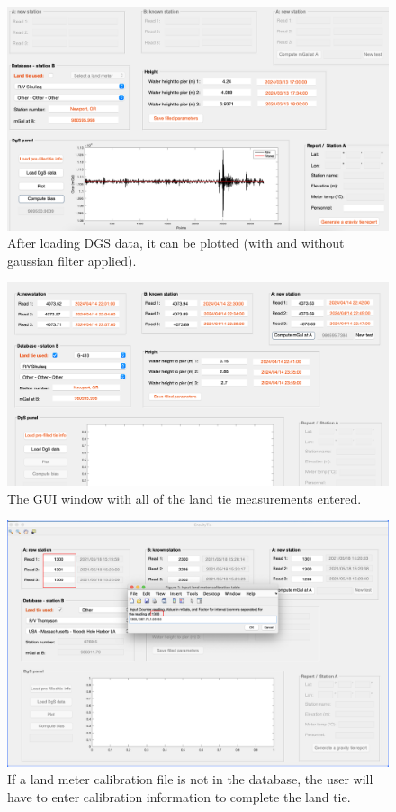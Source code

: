 \documentclass{pfpe-manual}
\begin{document}
\begin{figure}[ht!]
\centering
\includegraphics[width=\textwidth]{figs/plot_dgs.png}
\caption{After loading DGS data, it can be plotted (with and without gaussian filter applied).}
\label{gui:plot}
\end{figure}

\begin{figure}[ht!]
\centering
\includegraphics[width=\textwidth]{figs/land_tie_filled.png}
\caption{The GUI window with all of the land tie measurements entered.}
\label{gui:landtie}
\end{figure}

\begin{figure}[ht!]
\centering
\includegraphics[width=\textwidth]{figs/land_tie_cal.png}
\caption{If a land meter calibration file is not in the database, the user will have to enter calibration information to complete the land tie.}
\label{gui:cal}
\end{figure}
\end{document}
